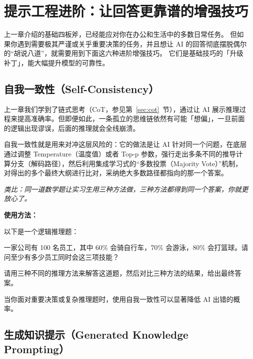 % 
% 


\chapter{提示工程进阶：让回答更靠谱的增强技巧}
\label{ch:prompting-intermediate}

上一章介绍的基础四板斧，已经能应对你在办公和生活中的多数日常任务。
但如果你遇到需要极其严谨或关乎重要决策的任务，并且想让 AI 的回答彻底摆脱偶尔的“胡说八道”，就需要用到下面这六种进阶增强技巧。
它们是基础技巧的「升级补丁」，能大幅提升模型的可靠性。

\section{自我一致性（Self-Consistency）}
\label{sec:self-consistency}

上一章我们学到了链式思考（CoT，参见第~\ref{sec:cot}~节），通过让 AI 展示推理过程来提高准确率。但即便如此，一条孤立的思维链依然有可能「想偏」，一旦前面的逻辑出现谬误，后面的推理就会全线崩溃。

自我一致性就是用来对冲这层风险的：它的做法是让 AI 针对同一个问题，在底层通过调整 Temperature（温度值）或者 Top-p 参数，强行走出多条不同的推导计算分支（解码路径），然后利用集成学习式的“多数投票（Majority Vote）”机制，对得出的多个最终大纲进行比对，采纳绝大多数路径都指向的那一个答案。

\textit{类比：同一道数学题让实习生用三种方法做，三种方法都得到同一个答案，你就更放心了。}

\textbf{使用方法：}

\begin{promptbox}
以下是一个逻辑推理题：

一家公司有 100 名员工，其中 60\% 会骑自行车，70\% 会游泳，80\% 会打篮球。请问至少有多少员工同时会这三项技能？

请用三种不同的推理方法来解答这道题，然后对比三种方法的结果，给出最终答案。
\end{promptbox}

当你面对重要决策或复杂推理题时，使用自我一致性可以显著降低 AI 出错的概率。

\section{生成知识提示（Generated Knowledge Prompting）}

